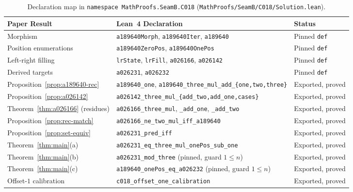 \documentclass[11pt]{article}
\theoremstyle{definition}
\begin{document}
\begin{table}[ht]
\centering
\caption{Declaration map in \texttt{namespace MathProofs.SeamB.C018} (\nolinkurl{MathProofs/SeamB/C018/Solution.lean}).}
\label{tab:lean-map}
\smallskip
{\small
\begin{tabular}{@{}l l l@{}}
\toprule
Paper Result & Lean~4 Declaration & Status \\
\midrule
Morphism & \texttt{a189640Morph}, \texttt{a189640Iter}, \texttt{a189640} & Pinned \texttt{def} \\
Position enumerations & \texttt{a189640ZeroPos}, \texttt{a189640OnePos} & Pinned \texttt{def} \\
Left-right filling & \texttt{lrState}, \texttt{lrFill}, \texttt{a026166}, \texttt{a026142} & Pinned \texttt{def} \\
Derived targets & \texttt{a026231}, \texttt{a026232} & Pinned \texttt{def} \\
Proposition~\ref{prop:a189640-rec} & \texttt{a189640\_one}, \texttt{a189640\_three\_mul\_add\_\{one,two,three\}} & Exported, proved \\
Proposition~\ref{prop:a026142} & \texttt{a026142\_three\_mul\_\{add\_two,add\_one,cases\}} & Exported, proved \\
Theorem~\ref{thm:a026166} (residues) & \texttt{a026166\_three\_mul}, \texttt{\_add\_one}, \texttt{\_add\_two} & Exported, proved \\
Proposition~\ref{prop:rec-match} & \texttt{a026166\_ne\_two\_mul\_iff\_a189640} & Exported, proved \\
Proposition~\ref{prop:set-equiv} & \texttt{a026231\_pred\_iff} & Exported, proved \\
Theorem~\ref{thm:main}(a) & \texttt{a026231\_eq\_three\_mul\_onePos\_sub\_one} & Exported, proved \\
Theorem~\ref{thm:main}(b) & \texttt{a026231\_mod\_three} (pinned, guard $1 \le n$) & Exported, proved \\
Theorem~\ref{thm:main}(c) & \texttt{a189640\_onePos\_eq\_a026232} (pinned, guard $1 \le n$) & Exported, proved \\
Offset-$1$ calibration & \texttt{c018\_offset\_one\_calibration} & Exported, proved \\
\bottomrule
\end{tabular}
}
\end{table}
\end{document}
